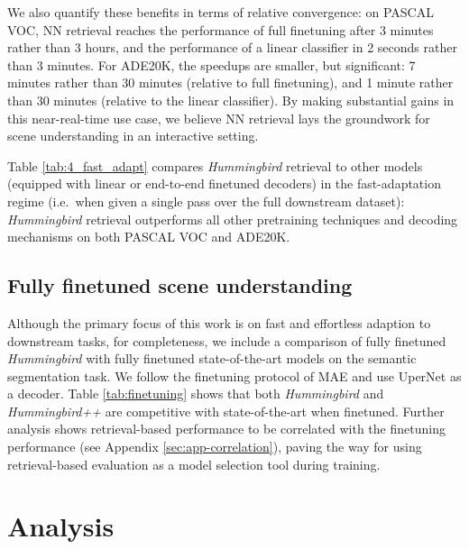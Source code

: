 \documentclass{article}
\newcommand{\ours}{\textit{Hummingbird} }
\newcommand{\oursup}{\textit{Hummingbird}\textit{++} }
\begin{document}
We also quantify these benefits in terms of relative convergence: on PASCAL VOC, NN retrieval reaches the performance of full finetuning after 3 minutes rather than 3 hours, and the performance of a linear classifier in 2 seconds rather than 3 minutes. For ADE20K, the speedups are smaller, but significant: 7 minutes rather than 30 minutes (relative to full finetuning), and 1 minute rather than 30 minutes (relative to the linear classifier). By making substantial gains in this near-real-time use case, we believe NN retrieval lays the groundwork for scene understanding in an interactive setting.

Table \ref{tab:4_fast_adapt} compares \ours retrieval to other models (equipped with linear or end-to-end finetuned decoders) in the fast-adaptation regime (i.e.\ when given a single pass over the full downstream dataset): \ours retrieval outperforms all other pretraining techniques and decoding mechanisms on both PASCAL VOC and ADE20K.

\subsection{Fully finetuned scene understanding} \label{sec:eval_finetune}

Although the primary focus of this work is on fast and effortless adaption to downstream tasks, for completeness, we include a comparison of fully finetuned \ours with fully finetuned state-of-the-art models on the semantic segmentation task. We follow the finetuning protocol of MAE \cite{he2021masked} and use UperNet \cite{xiao2018unified} as a decoder. Table \ref{tab:finetuning} shows that both \ours and \oursup are competitive with state-of-the-art when finetuned. Further analysis shows retrieval-based performance to be correlated with the finetuning performance (see Appendix \ref{sec:app-correlation}), paving the way for using retrieval-based evaluation as a model selection tool during training.





\section{Analysis}
\end{document}
